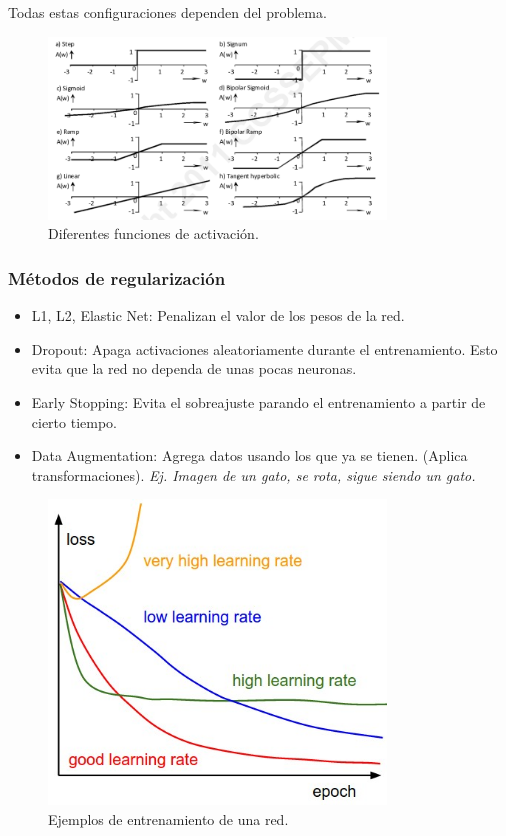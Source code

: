 \documentclass[titlepage,a4paper]{article}
\begin{document}
Todas estas configuraciones dependen del problema. 

\begin{figure}[!htb]
    \centering
    \includegraphics[width=0.8\textwidth]{imagenesResumen/FuncionesActivacion.png}
    \caption{Diferentes funciones de activación.}
\end{figure}

\subsubsection*{Métodos de regularización}
\begin{itemize}
    \item L1, L2, Elastic Net: Penalizan el valor de los pesos de la red.
    \item Dropout: Apaga activaciones aleatoriamente durante el entrenamiento. Esto evita que la red no dependa de unas pocas neuronas.
    \item Early Stopping: Evita el sobreajuste parando el entrenamiento a partir de cierto tiempo.
    \item Data Augmentation: Agrega datos usando los que ya se tienen. (Aplica transformaciones). \textit{Ej. Imagen de un gato, se rota, sigue siendo un gato.}
\end{itemize}

\begin{figure}[!htb]
    \centering
    \includegraphics[width=0.8\textwidth]{imagenesResumen/EjemplosEntrenamiento.jpeg}
    \caption{Ejemplos de entrenamiento de una red.}
\end{figure}
\end{document}
